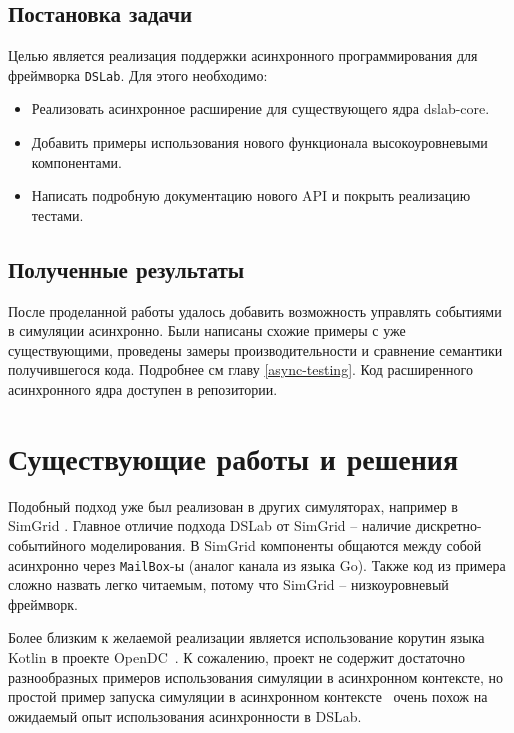 \subsection{Постановка задачи}
Целью является реализация поддержки асинхронного программирования для фреймворка \texttt{DSLab}. Для этого необходимо:
\begin{itemize}
    \item Реализовать асинхронное расширение для существующего ядра dslab-core.
    \item Добавить примеры использования нового функционала высокоуровневыми компонентами.
    \item Написать подробную документацию нового API и покрыть реализацию тестами.
\end{itemize}

\subsection{Полученные результаты}

После проделанной работы удалось добавить возможность управлять событиями в симуляции асинхронно. Были написаны схожие примеры с уже существующими, проведены замеры производительности и сравнение семантики получившегося кода. Подробнее см главу \ref{async-testing}. Код расширенного асинхронного ядра доступен в репозитории\cite{async-dslab-core}.


\section{Существующие работы и решения}

Подобный подход уже был реализован в других симуляторах, например в SimGrid \cite{simgrid-example}\cite{simgrid-article}. Главное отличие подхода DSLab от SimGrid -- наличие дискретно-событийного моделирования. В SimGrid компоненты общаются между собой асинхронно через \texttt{MailBox}-ы (аналог канала из языка Go). Также код из примера сложно назвать легко читаемым, потому что SimGrid -- низкоуровневый фреймворк. 

Более близким к желаемой реализации является использование корутин языка Kotlin в проекте OpenDC~\cite{opendc-repo}\cite{opendc-article}. К сожалению, проект не содержит достаточно разнообразных примеров использования симуляции в асинхронном контексте, но простой пример запуска симуляции в асинхронном контексте~\cite{opendc-example} очень похож на ожидаемый опыт использования асинхронности в DSLab.


